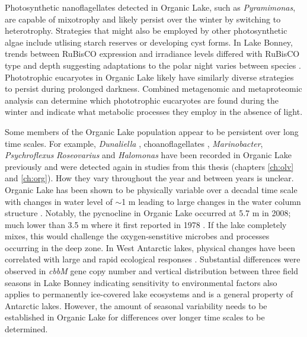 Photosynthetic nanoflagellates detected in Organic Lake, such as \emph{Pyramimonas}, are capable of mixotrophy \cite{Bell2003} and likely persist over the winter by switching to heterotrophy.
Strategies that might also be employed by other photosynthetic algae include utlising starch reserves or developing cyst forms.
In Lake Bonney, trends between \acs{RuBisCO} expression and irradiance levels differed with \acs{RuBisCO} type and depth suggesting adaptations to the polar night varies between species \cite{Kong2012a}.
Phototrophic eucaryotes in Organic Lake likely have similarly diverse strategies to persist during prolonged darkness.
Combined metagenomic and metaproteomic analysis can determine which phototrophic eucaryotes are found during the winter and indicate what metabolic processes they employ in the absence of light.

Some members of the Organic Lake population appear to be persistent over long time scales.
For example, \emph{Dunaliella} \cite{Franzmann1987b}, choanoflagellates \cite{vandenHoff1986}, \emph{Marinobacter}, \emph{Psychroflexus} \emph{Roseovarius} and \emph{Halomonas} \cite{Bowman2000a} have been recorded in Organic Lake previously and were detected again in studies from this thesis (chapters \ref{ch:olv} and \ref{ch:org}).
How they vary throughout the year and between years is unclear.
Organic Lake has been shown to be physically variable over a decadal time scale with changes in water level of $\sim$1 m leading to large changes in the water column structure \cite{Gibson1995, Gibson1996}.
Notably, the pycnocline in Organic Lake occurred at 5.7 m in 2008; much lower than 3.5 m where it first reported in 1978 \cite{Franzmann1987b}.
If the lake completely mixes, this would challenge the oxygen-senstitive microbes and processes occurring in the deep zone.
In West Antarctic lakes, physical changes have been correlated with large and rapid ecological responses \cite{Quayle2002}.
Substantial differences were observed in \emph{cbbM} gene copy number and vertical distribution between three field seasons in Lake Bonney \cite{Kong2012b} indicating sensitivity to environmental factors also applies to permanently ice-covered lake ecosystems and is a general property of Antarctic lakes.
However, the amount of seasonal variability needs to be established in Organic Lake for differences over longer time scales to be determined.

